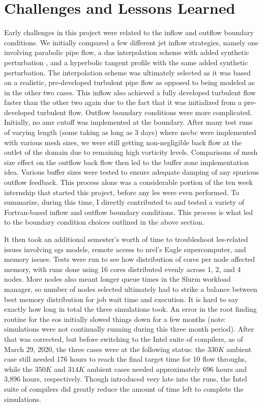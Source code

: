 \section{Challenges and Lessons Learned}
Early challenges in this project were related to the inflow and outflow boundary conditions. We initially compared a few different jet inflow strategies, namely one involving parabolic pipe flow, a \gls{dns} interpolation scheme with added synthetic perturbation \cite{boersma1999large}, and a hyperbolic tangent profile with the same added synthetic perturbation. The interpolation scheme was ultimately selected as it was based on a realistic, pre-developed turbulent pipe flow \cite{DNS} as opposed to being modeled as in the other two cases. This inflow also achieved a fully developed turbulent flow faster than the other two again due to the fact that it was initialized from a pre-developed turbulent flow. Outflow boundary conditions were more complicated. Initially, no \gls{amr} cutoff was implemented at the boundary. After many test runs of varying length (some taking as long as 3 days) where \gls{nscbc} were implemented \cite{poinsot1992boundary} with various mesh sizes, we were still getting non-negligible back flow at the outlet of the domain due to remaining high vorticity levels. Comparisons of mesh size effect on the outflow back flow then led to the buffer zone implementation idea. Various buffer sizes were tested to ensure adequate damping of any spurious outflow feedback. This process alone was a considerable portion of the ten week internship that started this project, before any \gls{les} were even performed. To summarize, during this time, I directly contributed to and tested a variety of Fortran-based inflow and outflow boundary conditions. This process is what led to the boundary condition choices outlined in the above section.

It then took an additional semester's worth of time to troubleshoot \gls{les}-related issues involving \gls{sgs} models, remote access to \gls{nrel}'s Eagle supercomputer, and memory issues. Tests were run to see how distribution of cores per node affected memory, with runs done using 16 cores distributed evenly across 1, 2, and 4 nodes. More nodes also meant longer queue times in the Slurm workload manager, so number of nodes selected ultimately had to strike a balance between best memory distribution for job wait time and execution. It is hard to say exactly how long in total the three simulations took. An error in the root finding routine for the \gls{eos} initially slowed things down for a few months (note: simulations were not continually running during this three month period). After that was corrected, but before switching to the Intel suite of compilers, as of March 29, 2020, the three cases were at the following status: the $330 K$ ambient case still needed 176 hours to reach the final target time for 10 flow throughs, while the $350 K$ and $314 K$ ambient cases needed approximately 696 hours and 3,896 hours, respectively. Though introduced very late into the runs, the Intel suite of compilers did greatly reduce the amount of time left to complete the simulations. 

